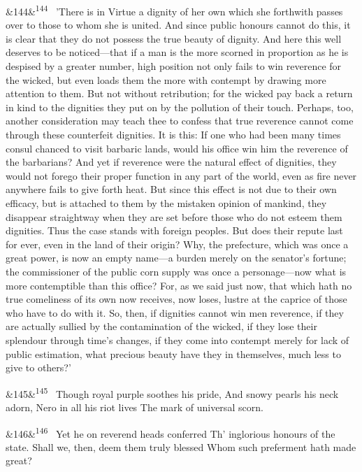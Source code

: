 \documentclass[12pt]{article}
\newcommand{\para}[1][]{\par\noindent\ifx&#1&\else\textsuperscript{\footnotesize #1}~\fi}
\begin{document}
\para[144] 'There is in Virtue a dignity of her own which she forthwith passes over to those to whom she is united. And since public honours cannot do this, it is clear that they do not possess the true beauty of dignity. And here this well deserves to be noticed---that if a man is the more scorned in proportion as he is despised by a greater number, high position not only fails to win reverence for the wicked, but even loads them the more with contempt by drawing more attention to them. But not without retribution; for the wicked pay back a return in kind to the dignities they put on by the pollution of their touch. Perhaps, too, another consideration may teach thee to confess that true reverence cannot come through these counterfeit dignities. It is this: If one who had been many times consul chanced to visit barbaric lands, would his office win him the reverence of the barbarians? And yet if reverence were the natural effect of dignities, they would not forego their proper function in any part of the world, even as fire never anywhere fails to give forth heat. But since this effect is not due to their own efficacy, but is attached to them by the mistaken opinion of mankind, they disappear straightway when they are set before those who do not esteem them dignities. Thus the case stands with foreign peoples. But does their repute last for ever, even in the land of their origin? Why, the prefecture, which was once a great power, is now an empty name---a burden merely on the senator's fortune; the commissioner of the public corn supply was once a personage---now what is more contemptible than this office? For, as we said just now, that which hath no true comeliness of its own now receives, now loses, lustre at the caprice of those who have to do with it. So, then, if dignities cannot win men reverence, if they are actually sullied by the contamination of the wicked, if they lose their splendour through time's changes, if they come into contempt merely for lack of public estimation, what precious beauty have they in themselves, much less to give to others?'

\para[145] Though royal purple soothes his pride, And snowy pearls his neck adorn, Nero in all his riot lives The mark of universal scorn.

\para[146] Yet he on reverend heads conferred Th' inglorious honours of the state. Shall we, then, deem them truly blessed Whom such preferment hath made great?
\end{document}
